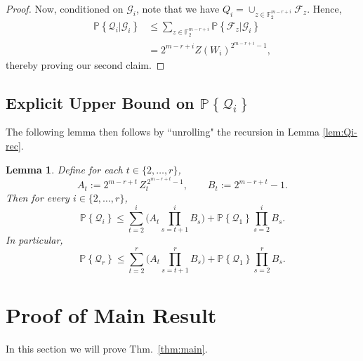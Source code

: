 \documentclass[conference,letterpaper]{IEEEtran}
\newcommand{\cG}{\ensuremath{\mathcal{G}}}
\newcommand{\cQ}{\ensuremath{\mathcal{Q}}}
\newcommand{\F}{{\mathbb F}}
\newcommand{\PR}[1]{{\mathbb{P}}\left\{ #1\right\}}
\newtheorem{lemma}[theorem]{Lemma}
\begin{document}
\begin{proof}
Now, conditioned on $\cG_i$, note that we have $Q_i = \cup_{z\in \F_2^{m-r+i}} \mathcal{F}_z$. Hence, 
\begin{align*}
\PR{ { \cQ_i } | \cG_i} &\leq  \sum_{z\in \F_2^{m-r+i}} \PR{ \mathcal{F}_z | \cG_i}\\ &= 2^{m-r+i } Z( W_i ) ^{ 2^{m-r+i} -1 },
\end{align*}
thereby proving our second claim. 
\end{proof}
\subsection{Explicit Upper Bound on $\PR{ \cQ_i }$}
The following lemma then follows by ``unrolling" the recursion in Lemma \ref{lem:Qi-rec}.
\begin{lemma}\label{lem:Qi-unroll}
Define for each $t\in\{2,\dots,r\}$,
\[
A_t := 2^{m-r+t}\, Z_t^{\,2^{m-r+t}-1},
\qquad
B_t := 2^{m-r+t}-1.
\]
Then for every $i\in\{2,\dots,r\}$,
\begin{equation*}\label{eq:Qi-unrolled}
\PR{\cQ_i}
\le
\sum_{t=2}^{i}\Bigg( A_t \prod_{s=t+1}^{i} B_s \Bigg)
+
\PR{\cQ_1}\prod_{s=2}^{i} B_s .
\end{equation*}
In particular, 
\begin{equation*}\label{eq:Qr-unrolled}
\PR{\cQ_r}
\le
\sum_{t=2}^{r}\Bigg( A_t \prod_{s=t+1}^{r} B_s \Bigg)
+
\PR{\cQ_1}\prod_{s=2}^{r} B_s .
\end{equation*}
\end{lemma}

\section{Proof of Main Result}

In this section we will prove Thm.~\ref{thm:main}. 
\end{document}
